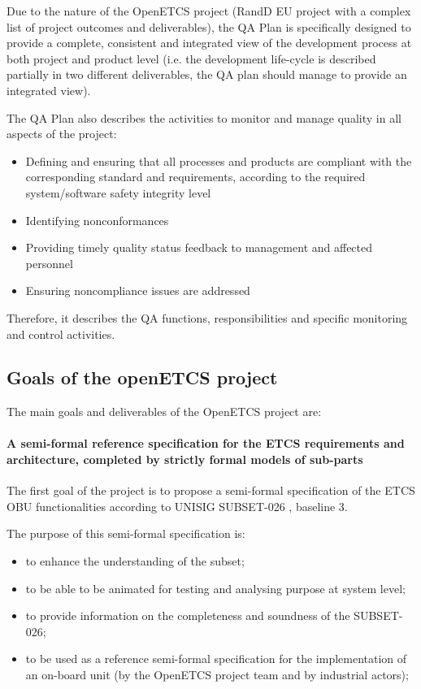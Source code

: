 \documentclass{template/openetcs_article}
\begin{document}
Due to the nature of the OpenETCS project (\gls{RandD} EU project with a complex list of project outcomes and deliverables), the QA Plan is specifically designed to provide a complete, consistent and integrated view of the development process at both project and product level (i.e. the development life-cycle is described partially in two different deliverables, the QA plan should manage to provide an integrated view).

The QA Plan also describes the activities to monitor and manage quality in all aspects of the project:

\begin{itemize}
\item Defining and ensuring that all processes and products are compliant with the corresponding standard and requirements, according to the required system/software safety integrity level
\item Identifying nonconformances
\item Providing timely quality status feedback to management and affected personnel
\item Ensuring noncompliance issues are addressed
\end{itemize}

Therefore, it describes the QA functions, responsibilities and specific monitoring and control activities.


\subsection{Goals of the openETCS project}

The main goals and deliverables of the OpenETCS project are:

\paragraph{A semi-formal reference specification for the ETCS requirements and architecture, completed by strictly formal models of sub-parts}
The first goal of the project is to propose a semi-formal specification of the \gls{ETCS} \gls{OBU} functionalities according to UNISIG SUBSET-026 \citep{subset026}, baseline 3.

The purpose of this semi-formal specification is:
\begin{itemize}
\item to enhance the understanding of the subset;
\item to be able to be animated for testing and analysing purpose at system level;
\item to provide information on the completeness and soundness of the SUBSET-026;
\item to be used as a reference semi-formal specification for the implementation of an on-board unit
(by the OpenETCS project team and by industrial actors);
\end{itemize}
\end{document}
